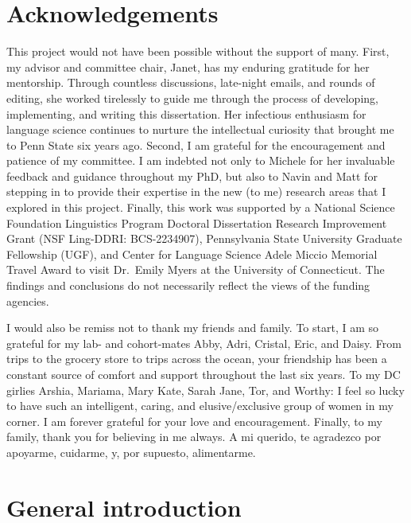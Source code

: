 \documentclass[
  12pt,
  twoside]{article}
\begin{document}
\clearpage
{}
{}
\listoftables

\clearpage
\section*{Acknowledgements}

This project would not have been possible without the support of many.
First, my advisor and committee chair, Janet, has my enduring gratitude for her mentorship.
Through countless discussions, late-night emails, and rounds of editing, she worked tirelessly to guide me through the process of developing, implementing, and writing this dissertation.
Her infectious enthusiasm for language science continues to nurture the intellectual curiosity that brought me to Penn State six years ago.
Second, I am grateful for the encouragement and patience of my committee.
I am indebted not only to Michele for her invaluable feedback and guidance throughout my PhD, but also to Navin and Matt for stepping in to provide their expertise in the new (to me) research areas that I explored in this project.
Finally, this work was supported by a National Science Foundation Linguistics Program Doctoral Dissertation Research Improvement Grant (NSF Ling-DDRI: BCS-2234907), Pennsylvania State University Graduate Fellowship (UGF), and Center for Language Science Adele Miccio Memorial Travel Award to visit Dr.~Emily Myers at the University of Connecticut.
The findings and conclusions do not necessarily reflect the views of the funding agencies.

I would also be remiss not to thank my friends and family.
To start, I am so grateful for my lab- and cohort-mates Abby, Adri, Cristal, Eric, and Daisy.
From trips to the grocery store to trips across the ocean, your friendship has been a constant source of comfort and support throughout the last six years.
To my DC girlies Arshia, Mariama, Mary Kate, Sarah Jane, Tor, and Worthy: I feel so lucky to have such an intelligent, caring, and elusive/exclusive group of women in my corner.
I am forever grateful for your love and encouragement.
Finally, to my family, thank you for believing in me always.
A mi querido, te agradezco por apoyarme, cuidarme, y, por supuesto, alimentarme.

\newpage
{}

\hypertarget{general-introduction}{%
\section{General introduction}\label{general-introduction}}
\end{document}

